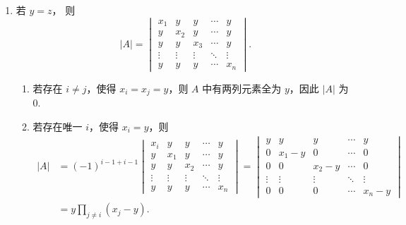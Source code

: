 \documentclass[UTF8,12pt,a4paper,fontset=fandol]{ctexart}
\begin{document}
\begin{solve}
\begin{enumerate}
                \item 若 $y = z$，
                    则
                    \[
                        |A| = \begin{vmatrix}
                            x_1    & y      & y      & \cdots & y      \\
                            y      & x_2    & y      & \cdots & y      \\
                            y      & y      & x_3    & \cdots & y      \\
                            \vdots & \vdots & \vdots & \ddots & \vdots \\
                            y      & y      & y      & \cdots & x_n
                        \end{vmatrix}.
                    \]

                    \begin{enumerate}
                        \item 若存在 $i \neq j$，使得 $x_i = x_j = y$，则 $A$ 中有两列元素全为 $y$，因此 $|A|$ 为 $0$.

                        \item 若存在唯一 $i$，使得 $x_i = y$，则
                            \begin{align*}
                                |A| &= (-1)^{i - 1 + i - 1} \begin{vmatrix}
                                    x_i    & y      & y      & \cdots & y      \\
                                    y      & x_1    & y      & \cdots & y      \\
                                    y      & y      & x_2    & \cdots & y      \\
                                    \vdots & \vdots & \vdots & \ddots & \vdots \\
                                    y      & y      & y      & \cdots & x_n
                                \end{vmatrix}
                                = \begin{vmatrix}
                                    y      & y       & y       & \cdots & y       \\
                                    0      & x_1 - y & 0       & \cdots & 0       \\
                                    0      & 0       & x_2 - y & \cdots & 0       \\
                                    \vdots & \vdots  & \vdots  & \ddots & \vdots  \\
                                    0      & 0       & 0       & \cdots & x_n - y
                                \end{vmatrix} \\
                                &= y \prod_{j \neq i} (x_j - y).
                            \end{align*}


\end{enumerate}
\end{enumerate}
\end{solve}
\end{document}
